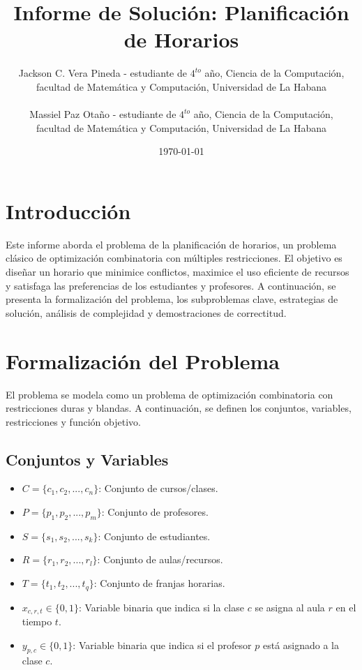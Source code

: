 \documentclass[12pt, a4paper]{article}
\title{Informe de Solución: Planificación de Horarios}
\author{Jackson C. Vera Pineda - estudiante de $4^{to}$ año, Ciencia de la Computación, \\
		facultad de Matemática y Computación, Universidad de La Habana\\\\
		Massiel Paz Otaño - estudiante de $4^{to}$ año, Ciencia de la Computación, \\
		facultad de Matemática y Computación, Universidad de La Habana}
\date{\today}
\begin{document}
\maketitle

\section{Introducción}
Este informe aborda el problema de la planificación de horarios, un problema clásico de optimización combinatoria con múltiples restricciones. El objetivo es diseñar un horario que minimice conflictos, maximice el uso eficiente de recursos y satisfaga las preferencias de los estudiantes y profesores. A continuación, se presenta la formalización del problema, los subproblemas clave, estrategias de solución, análisis de complejidad y demostraciones de correctitud.

\section{Formalización del Problema}
El problema se modela como un problema de optimización combinatoria con restricciones duras y blandas. A continuación, se definen los conjuntos, variables, restricciones y función objetivo.

\subsection{Conjuntos y Variables}
\begin{itemize}
    \item \( C = \{c_1, c_2, ..., c_n\} \): Conjunto de cursos/clases.
    \item \( P = \{p_1, p_2, ..., p_m\} \): Conjunto de profesores.
    \item \( S = \{s_1, s_2, ..., s_k\} \): Conjunto de estudiantes.
    \item \( R = \{r_1, r_2, ..., r_l\} \): Conjunto de aulas/recursos.
    \item \( T = \{t_1, t_2, ..., t_q\} \): Conjunto de franjas horarias.
    \item \( x_{c, r, t} \in \{0, 1\} \): Variable binaria que indica si la clase \( c \) se asigna al aula \( r \) en el tiempo \( t \).
    \item \( y_{p, c} \in \{0, 1\} \): Variable binaria que indica si el profesor \( p \) está asignado a la clase \( c \).
\end{itemize}
\end{document}
